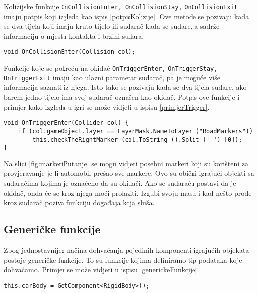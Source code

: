Kolizijske funkcije \texttt{OnCollisionEnter, OnCollisionStay,} \newline \texttt{OnCollisionExit} imaju potpis koji izgleda kao ispis \ref{potpisKolizije}. Ove metode se pozivaju kada se dva tijela koji imaju kruto tijelo ili sudarač kada se sudare, a sadrže informaciju o mjestu kontakta i brzini sudara.
\begin{lstlisting}[caption={Potpis kolizijskih funkcija}, label=potpisKolizije]
void OnCollisionEnter(Collision col);
\end{lstlisting} \par
Funkcije koje se pokreću na okidač \texttt{OnTriggerEnter,} \newline \texttt{OnTriggerStay, OnTriggerExit} imaju kao ulazni parametar sudarač, pa je moguće više informacija saznati iz njega. Isto tako se pozivaju kada se dva tijela sudare, ako barem jedno tijelo ima svoj sudarač označen kao okidač. Potpis ove funkcije i primjer kako izgleda u igri se može vidjeti u ispisu \ref{primjerTrigger}.
\begin{lstlisting}[caption={Potpis i primjer trigger funkcije}, label=primjerTrigger]
void OnTriggerEnter(Collider col) {
	if (col.gameObject.layer == LayerMask.NameToLayer ("RoadMarkers"))
		this.checkTheRightMarker (col.ToString ().Split (' ') [0]);
}
\end{lstlisting} \par
Na slici \ref{fig:markeriPutanje} se mogu vidjeti posebni markeri koji su korišteni za provjeravanje je li automobil prešao sve markere. Ovo su obični igrajući objekti sa sudaračima kojima je označeno da su okidači. Ako se sudaraču postavi da je okidač, onda će se kroz njega moći prolaziti. Izgubi svoju masu i kad nešto prođe kroz sudarač poziva funkciju događaja koja sluša.
\subsection{Generičke funkcije}
Zbog jednostavnijeg načina dohvaćanja pojedinih komponenti igrajućih objekata postoje generičke funkcije. To su funkcije kojima definiramo tip podataka koje dohvaćamo. Primjer se može vidjeti u ispisu \ref{generickeFunkcije}
\begin{lstlisting}[caption={Primjer generičke funkcije}, label=generickeFunkcije]
this.carBody = GetComponent<RigidBody>();
\end{lstlisting}